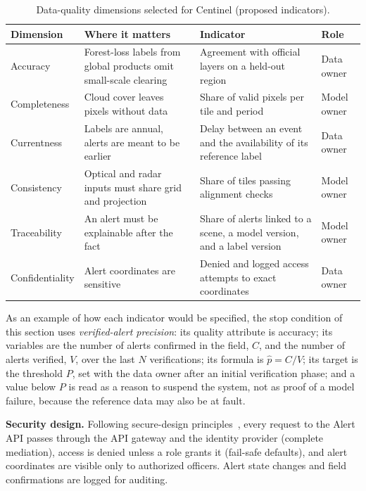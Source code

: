 \documentclass{article}
\begin{document}
\begin{table}[H]
\centering
\caption{Data-quality dimensions selected for Centinel (proposed indicators).}
\label{tab:dq}
\small
\begin{tabularx}{\linewidth}{l X X l}
\toprule
\textbf{Dimension} & \textbf{Where it matters} & \textbf{Indicator} & \textbf{Role} \\
\midrule
Accuracy & Forest-loss labels from global products omit small-scale clearing & Agreement with official layers on a held-out region & Data owner \\
Completeness & Cloud cover leaves pixels without data & Share of valid pixels per tile and period & Model owner \\
Currentness & Labels are annual, alerts are meant to be earlier & Delay between an event and the availability of its reference label & Data owner \\
Consistency & Optical and radar inputs must share grid and projection & Share of tiles passing alignment checks & Model owner \\
Traceability & An alert must be explainable after the fact & Share of alerts linked to a scene, a model version, and a label version & Model owner \\
Confidentiality & Alert coordinates are sensitive & Denied and logged access attempts to exact coordinates & Data owner \\
\bottomrule
\end{tabularx}
\end{table}

As an example of how each indicator would be specified, the stop condition
of this section uses \emph{verified-alert precision}: its quality attribute is
accuracy; its variables are the number of alerts confirmed in the field,
$C$, and the number of alerts verified, $V$, over the last $N$ verifications;
its formula is $\hat{p} = C/V$; its target is the threshold $P$, set with the
data owner after an initial verification phase; and a value below $P$ is read as
a reason to suspend the system, not as proof of a model failure, because the
reference data may also be at fault.

\textbf{Security design.} Following secure-design
principles~\cite{saltzer2009}, every request to the Alert API passes through the
API gateway and the identity provider (complete mediation), access is denied
unless a role grants it (fail-safe defaults), and alert coordinates are visible
only to authorized officers. Alert state changes and field confirmations are
logged for auditing.
\end{document}
